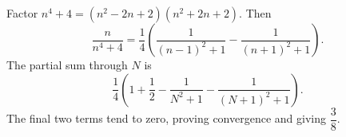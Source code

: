Factor $n^4+4=(n^2-2n+2)(n^2+2n+2)$. Then
\[
\dfrac{n}{n^4+4}
=\dfrac{1}{4}\left(\dfrac{1}{(n-1)^2+1}-\dfrac{1}{(n+1)^2+1}\right).
\]
The partial sum through $N$ is
\[
\dfrac{1}{4}\left(1+\dfrac{1}{2}-\dfrac{1}{N^2+1}-\dfrac{1}{(N+1)^2+1}\right).
\]
The final two terms tend to zero, proving convergence and giving $\boxed{\dfrac{3}{8}}$.
